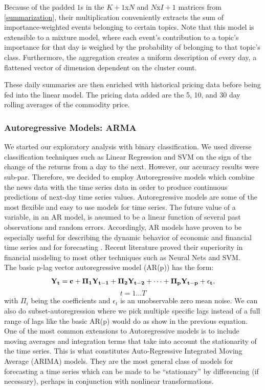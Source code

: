 Because of the padded $1$s in the $K+1$x$N$ and $N$x$I+1$ matrices from \ref{summarization}, their multiplication conveniently extracts the sum of importance-weighted events belonging to certain topics. Note that this model is extensible to a mixture model, where each event's contribution to a topic's importance for that day is weighed by the probability of belonging to that topic's class. Furthermore, the aggregation creates a uniform description of every day, a flattened vector of dimension dependent on the cluster count.

These daily summaries are then enriched with historical pricing data before being fed into the linear model. The pricing data added are the 5, 10, and 30 day rolling averages of the commodity price. %


\subsubsection{Autoregressive Models: ARMA}
We started our exploratory analysis with binary classification. We used diverse classification techniques such as Linear Regression and SVM on the sign of the change of the returns from a day to the next. However, our accuracy results were sub-par. Therefore, we decided to employ Autoregressive models which combine the news data with the time series data in order to produce continuous predictions of next-day time series values. %
Autoregressive models are some of the most flexible and easy to use models for time series. The future value of a variable, in an AR model, is assumed to be a linear function of several past observations and random errors. Accordingly, AR models have proven to be especially useful for describing the dynamic behavior of economic and financial time series and for forecasting \cite{tsay, VAR}. Recent literature proved their superiority in financial modeling to most other techniques such as Neural Nets and SVM. %
\\
The basic p-lag vector autoregressive model (AR(p)) has the form: $$\bf{Y}_t=\bf{c}+\bf{\Pi}_1\bf{Y}_{t-1}+\bf{\Pi}_2\bf{Y}_{t-2}+\cdots+\bf{\Pi}_p\bf{Y}_{t-p}+\epsilon_t,$$ $$t=1\ldots T$$ with $\Pi_i$ being the coefficients and $\epsilon_t$ is an unobservable zero mean noise. We can also do subset-autoregression where we pick multiple specific lags instead of a full range of lags like the basic AR(p) would do as show in the previous equation.
One of the most common extensions to Autoregressive models is to include moving averages and integration terms that take into account the stationarity of the time series. This is what constitutes Auto-Regressive Integrated Moving Average (ARIMA) models. They are  the most general class of models for forecasting a time series which can be made to be “stationary” by differencing (if necessary), perhaps in conjunction with nonlinear transformations.
